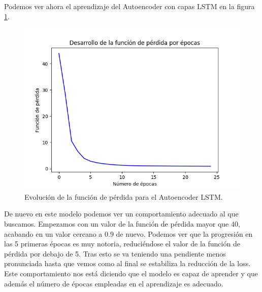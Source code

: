Podemos ver ahora el aprendizaje del Autoencoder con capas LSTM en la figura \ref{img:loss-autoencoder-lstm}.
\begin{figure}[]
	\centering
	\includegraphics[scale=0.75]{imagenes/loss_autoencoder_lstm.png}
	\caption{Evolución de la función de pérdida para el Autoencoder LSTM.}
	\label{img:loss-autoencoder-lstm}
\end{figure}

De nuevo en este modelo podemos ver un comportamiento adecuado al que buscamos. Empezamos con un valor de la función de pérdida mayor que 40, acabando en un valor cercano a $0.9$ de nuevo. Podemos ver que la progresión en las 5 primeras épocas es muy notoria, reduciéndose el valor de la función de pérdida por debajo de 5. Tras esto se va teniendo una pendiente menos pronunciada hasta que vemos como al final se estabiliza la reducción de la loss. Este comportamiento nos está diciendo que el modelo es capaz de aprender y que además el número de épocas empleadas en el aprendizaje es adecuado.

